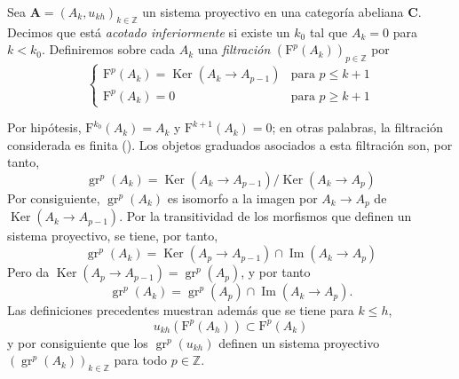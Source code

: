 \begin{env}[13.4.1]
\label{0.13.4.1}
\label{0.13.4.1-fr}
Sea
$\mathbf A=(A_k,u_{kh})_{k\in\mathbb Z}$ un sistema proyectivo en una
categoría abeliana $\boldsymbol{C}$.
Decimos que está \emph{acotado inferiormente} si existe un $k_0$ tal que
$A_k=0$ para $k<k_0$. Definiremos sobre cada $A_k$ una \emph{filtración} $(\mathrm F^p(A_k))_{p\in\mathbb Z}$ por
\begin{equation}
\label{0.13.4.1.1-fr}
\tag{13.4.1.1}
\begin{cases}
\mathrm F^p(A_k)=\operatorname{Ker}(A_k\longrightarrow A_{p-1})&\text{para }p\leq k+1\\
\mathrm F^p(A_k)=0&\text{para }p\geq k+1
\end{cases}
\end{equation}

Por hipótesis,
$\mathrm F^{k_0}(A_k)=A_k$ y
$\mathrm F^{k+1}(A_k)=0$; en otras palabras, la filtración considerada
es finita ().
Los objetos graduados asociados a esta filtración son, por tanto,
\[
\operatorname{gr}^p(A_k)=
\operatorname{Ker}(A_k\longrightarrow A_{p-1})
/\operatorname{Ker}(A_k\longrightarrow A_p)
\]
Por consiguiente, $\operatorname{gr}^p(A_k)$ es isomorfo a la imagen por
$A_k\to A_p$ de
$\operatorname{Ker}(A_k\to A_{p-1})$.
Por la transitividad de los morfismos que definen un sistema proyectivo,
se tiene, por tanto,
\begin{equation}
\label{0.13.4.1.2-fr}
\tag{13.4.1.2}
\operatorname{gr}^p(A_k)=
\operatorname{Ker}(A_p\longrightarrow A_{p-1})
\cap\operatorname{Im}(A_k\longrightarrow A_p)
\end{equation}
Pero  da
$\operatorname{Ker}(A_p\to A_{p-1})=\operatorname{gr}^p(A_p)$, y por tanto
\begin{equation}
\label{0.13.4.1.3-fr}
\tag{13.4.1.3}
\operatorname{gr}^p(A_k)=
\operatorname{gr}^p(A_p)\cap\operatorname{Im}(A_k\longrightarrow A_p).
\end{equation}
Las definiciones precedentes muestran además que se tiene para $k\leq h$,
\[
u_{kh}(\mathrm F^p(A_h))\subset\mathrm F^p(A_k)
\]
y por consiguiente que los $\operatorname{gr}^p(u_{kh})$ definen un sistema proyectivo
$(\operatorname{gr}^p(A_k))_{k\in\mathbb Z}$ para todo $p\in\mathbb Z$.
\end{env}

